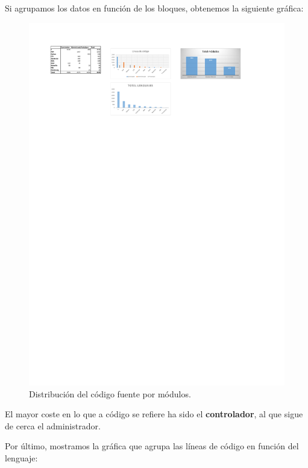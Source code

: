 Si agrupamos los datos en función de los bloques, obtenemos la siguiente gráfica:

\smallskip

\begin{figure}[H]
	\noindent \begin{centering}
		\includegraphics[width=\linewidth*3/4]{capitulo5/lineas_modulos}
		\par\end{centering}
	\smallskip
	\caption{\label{fig:lineas_modulos} Distribución del código fuente por módulos.}
\end{figure} 

\smallskip

El mayor coste en lo que a código se refiere ha sido el \textbf{controlador}, al que sigue de cerca el administrador.

Por último, mostramos la gráfica que agrupa las líneas de código en función del lenguaje:

